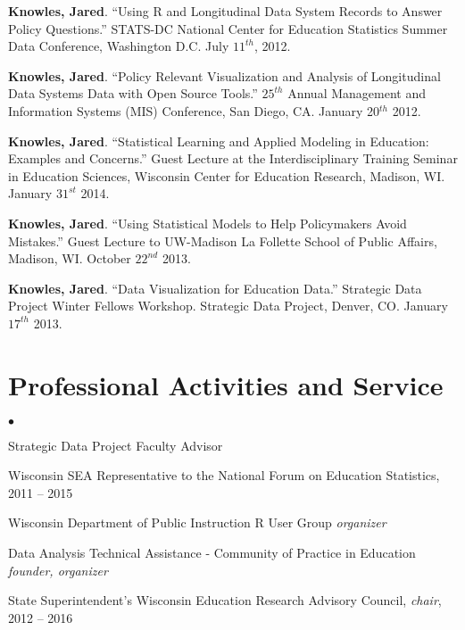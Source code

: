\documentclass[margin,line]{res}
\newenvironment{list2}{
  \begin{list}{$\bullet$}{%
      \setlength{\itemsep}{0in}
      \setlength{\parsep}{0in} \setlength{\parskip}{0in}
      \setlength{\topsep}{0in} \setlength{\partopsep}{0in} 
      \setlength{\leftmargin}{0.2in}}}{\end{list}}
\begin{document}
\begin{resume}
\textbf{Knowles, Jared}. ``Using R and Longitudinal Data System Records to Answer Policy Questions.'' STATS-DC National Center for Education Statistics Summer Data Conference, Washington D.C. July $11^{th}$, 2012.


\textbf{Knowles, Jared}. ``Policy Relevant Visualization and Analysis of Longitudinal Data Systems Data with Open Source Tools.'' $25^{th}$ Annual Management and Information Systems (MIS) Conference, San Diego, CA. January 20$^{th}$ 2012.

\textbf{Knowles, Jared}. ``Statistical Learning and Applied Modeling in Education: Examples 
and Concerns.'' Guest Lecture at the Interdisciplinary Training Seminar in Education Sciences, Wisconsin Center for Education Research, Madison, WI. January $31^{st}$ 2014.


\textbf{Knowles, Jared}. ``Using Statistical Models to Help Policymakers Avoid Mistakes.'' Guest Lecture to UW-Madison La Follette School of Public Affairs, Madison, WI. October $22^{nd}$ 2013.

\textbf{Knowles, Jared}. ``Data Visualization for Education Data.'' Strategic Data Project Winter Fellows Workshop. Strategic Data Project, Denver, CO. January $17^{th}$ 2013. 

\section{\sc Professional Activities and Service}

\begin{list2}
\item Strategic Data Project Faculty Advisor 
\item Wisconsin SEA Representative to the National Forum on Education Statistics, 2011 -- 2015
\item Wisconsin Department of Public Instruction R User Group \emph{organizer}
\item Data Analysis Technical Assistance - Community of Practice in Education \emph{founder, organizer} 
\item State Superintendent's Wisconsin Education Research Advisory Council, 
\emph{chair}, 2012 -- 2016
\end{list2}


\end{resume}
\end{document}
